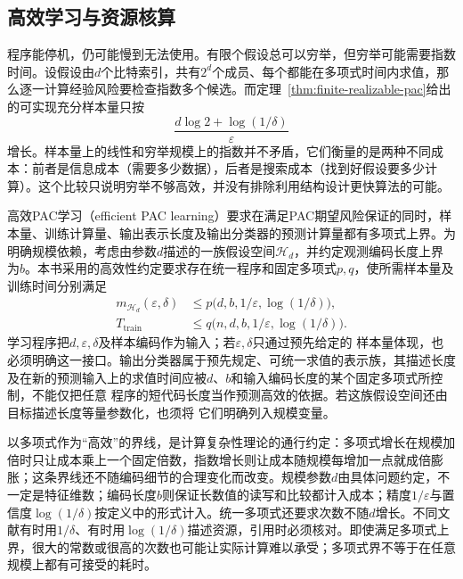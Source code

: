 \subsection{高效学习与资源核算}
\label{sec:efficient-pac-resources}

程序能停机，仍可能慢到无法使用。有限个假设总可以穷举，但穷举可能需要指数时间。设假设由$d$个比特索引，共有$2^d$个成员、每个都能在多项式时间内求值，那么逐一计算经验风险要检查指数多个候选。而定理~\ref{thm:finite-realizable-pac}给出的可实现充分样本量只按
\[
 \frac{d\log2+\log(1/\delta)}{\varepsilon}
\]
增长。样本量上的线性和穷举规模上的指数并不矛盾，它们衡量的是两种不同成本：前者是信息成本（需要多少数据），后者是搜索成本（找到好假设要多少计算）。这个比较只说明穷举不够高效，并没有排除利用结构设计更快算法的可能。

\begin{definition}[高效PAC学习]
\label{def:efficient-pac-learning}
高效PAC学习（efficient PAC learning）要求在满足PAC期望风险保证的同时，样本量、训练计算量、输出表示长度及输出分类器的预测计算量都有多项式上界。为明确规模依赖，考虑由参数$d$描述的一族假设空间$\mathcal H_d$，并约定观测编码长度上界为$b$。本书采用的高效性约定要求存在统一程序和固定多项式$p,q$，使所需样本量及训练时间分别满足
\begin{equation}
 \begin{aligned}
 m_{\mathcal H_d}(\varepsilon,\delta)
 &\leq p\bigl(d,b,1/\varepsilon,\log(1/\delta)\bigr),\\
 T_{\mathrm{train}}
 &\leq q\bigl(n,d,b,1/\varepsilon,\log(1/\delta)\bigr).
 \end{aligned}
 \label{eq:efficient-pac-resources}
\end{equation}
学习程序把$d,\varepsilon,\delta$及样本编码作为输入；若$\varepsilon,\delta$只通过预先给定的
样本量体现，也必须明确这一接口。输出分类器属于预先规定、可统一求值的表示族，其描述长度
及在新的预测输入上的求值时间应被$d$、$b$和输入编码长度的某个固定多项式所控制，不能仅把任意
程序的短代码长度当作预测高效的依据。若这族假设空间还由目标描述长度等量参数化，也须将
它们明确列入规模变量。
\end{definition}

以多项式作为“高效”的界线，是计算复杂性理论的通行约定：多项式增长在规模加倍时只让成本乘上一个固定倍数，指数增长则让成本随规模每增加一点就成倍膨胀；这条界线还不随编码细节的合理变化而改变。规模参数$d$由具体问题约定，不一定是特征维数；编码长度$b$则保证长数值的读写和比较都计入成本；精度$1/\varepsilon$与置信度$\log(1/\delta)$按定义中的形式计入。统一多项式还要求次数不随$d$增长。不同文献有时用$1/\delta$、有时用$\log(1/\delta)$描述资源，引用时必须核对。即使满足多项式上界，很大的常数或很高的次数也可能让实际计算难以承受；多项式界不等于在任意规模上都有可接受的耗时。

